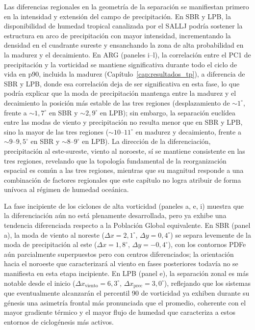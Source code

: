 Las diferencias regionales en la geometría de la separación se manifiestan primero en la intensidad y extensión del campo de precipitación. En SBR y LPB, la disponibilidad de humedad tropical canalizada por el SALLJ \citep{reboita2026meteorology} podría sostener la estructura en arco de precipitación con mayor intensidad, incrementando la densidad en el cuadrante sureste y ensanchando la zona de alta probabilidad en la madurez y el decaimiento. En ARG (paneles i--l), la correlación entre el PC1 de precipitación y la vorticidad se mantiene significativa durante todo el ciclo de vida en p90, incluida la madurez (Capítulo~\ref{cap:resultados_tp}), a diferencia de SBR y LPB, donde esa correlación deja de ser significativa en esta fase, lo que podría explicar que la moda de precipitación mantenga entre la madurez y el decaimiento la posición más estable de las tres regiones (desplazamiento de ${\sim}1^{\circ}$, frente a ${\sim}1{,}7^{\circ}$ en SBR y ${\sim}2{,}9^{\circ}$ en LPB); sin embargo, la separación euclídea entre las modas de viento y precipitación no resulta menor que en SBR y LPB, sino la mayor de las tres regiones (${\sim}10$--$11^{\circ}$ en madurez y decaimiento, frente a ${\sim}9$--$9{,}5^{\circ}$ en SBR y ${\sim}8$--$9^{\circ}$ en LPB). La dirección de la diferenciación, precipitación al este-sureste, viento al noroeste, sí se mantiene consistente en las tres regiones, revelando que la topología fundamental de la reorganización espacial es común a las tres regiones, mientras que su magnitud responde a una combinación de factores regionales que este capítulo no logra atribuir de forma unívoca al régimen de humedad oceánica.

La fase incipiente de los ciclones de alta vorticidad (paneles a, e, i) muestra que la diferenciación aún no está plenamente desarrollada, pero ya exhibe una tendencia diferenciada respecto a la Población Global equivalente. En SBR (panel a), la moda de viento al noreste ($\Delta x = 2{,}1^{\circ}$, $\Delta y = 0{,}4^{\circ}$) se separa levemente de la moda de precipitación al este ($\Delta x = 1{,}8^{\circ}$, $\Delta y = -0{,}4^{\circ}$), con los contornos PDFe aún parcialmente superpuestos pero con centros diferenciados; la orientación hacia el noroeste que caracterizará al viento en fases posteriores todavía no se manifiesta en esta etapa incipiente. En LPB (panel e), la separación zonal es más notable desde el inicio ($\Delta x_{\text{viento}} = 6{,}3^{\circ}$, $\Delta x_{\text{prec}} = 3{,}0^{\circ}$), reflejando que los sistemas que eventualmente alcanzarán el percentil 90 de vorticidad ya exhiben durante su génesis una asimetría frontal más pronunciada que el promedio, coherente con el mayor gradiente térmico y el mayor flujo de humedad que caracteriza a estos entornos de ciclogénesis más activos.


